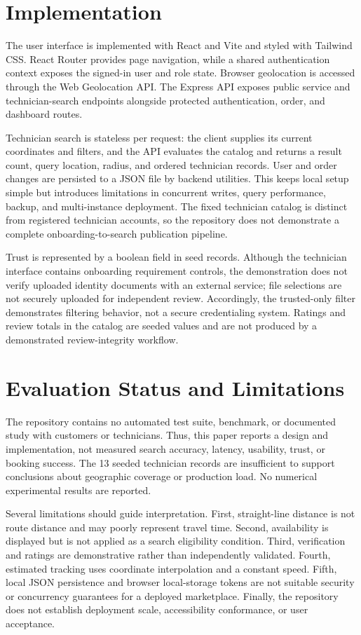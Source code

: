 \documentclass[conference]{IEEEtran}
\begin{document}
\section{Implementation}
The user interface is implemented with React and Vite and styled with Tailwind CSS. React Router provides page navigation, while a shared authentication context exposes the signed-in user and role state. Browser geolocation is accessed through the Web Geolocation API. The Express API exposes public service and technician-search endpoints alongside protected authentication, order, and dashboard routes.

Technician search is stateless per request: the client supplies its current coordinates and filters, and the API evaluates the catalog and returns a result count, query location, radius, and ordered technician records. User and order changes are persisted to a JSON file by backend utilities. This keeps local setup simple but introduces limitations in concurrent writes, query performance, backup, and multi-instance deployment. The fixed technician catalog is distinct from registered technician accounts, so the repository does not demonstrate a complete onboarding-to-search publication pipeline.

Trust is represented by a boolean field in seed records. Although the technician interface contains onboarding requirement controls, the demonstration does not verify uploaded identity documents with an external service; file selections are not securely uploaded for independent review. Accordingly, the trusted-only filter demonstrates filtering behavior, not a secure credentialing system. Ratings and review totals in the catalog are seeded values and are not produced by a demonstrated review-integrity workflow.

\section{Evaluation Status and Limitations}
The repository contains no automated test suite, benchmark, or documented study with customers or technicians. Thus, this paper reports a design and implementation, not measured search accuracy, latency, usability, trust, or booking success. The 13 seeded technician records are insufficient to support conclusions about geographic coverage or production load. No numerical experimental results are reported.

Several limitations should guide interpretation. First, straight-line distance is not route distance and may poorly represent travel time. Second, availability is displayed but is not applied as a search eligibility condition. Third, verification and ratings are demonstrative rather than independently validated. Fourth, estimated tracking uses coordinate interpolation and a constant speed. Fifth, local JSON persistence and browser local-storage tokens are not suitable security or concurrency guarantees for a deployed marketplace. Finally, the repository does not establish deployment scale, accessibility conformance, or user acceptance.
\end{document}
